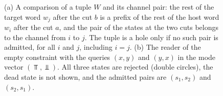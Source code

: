 \begin{figure}[t]
\caption{(a) A comparison of a tuple $W$ and its channel pair: the rest of
the target word $w_j$ after the cut $b$ is a prefix of the rest of the host
word $w_i$ after the cut $a$, and the pair of the states at the two cuts
belongs to the channel from $i$ to $j$. The tuple is a hole only if no such
pair is admitted, for all $i$ and $j$, including $i=j$. (b) The reader of
the empty constraint with the queries $(x,y)$ and $(y,x)$ in the mode vector
$(\Top,\Bot)$. All three states are rejected (double circles), the dead
state is not shown, and the admitted pairs are $(s_1,s_2)$ and
$(s_2,s_1)$.}
\label{fig:reader-hole}
\end{figure}

